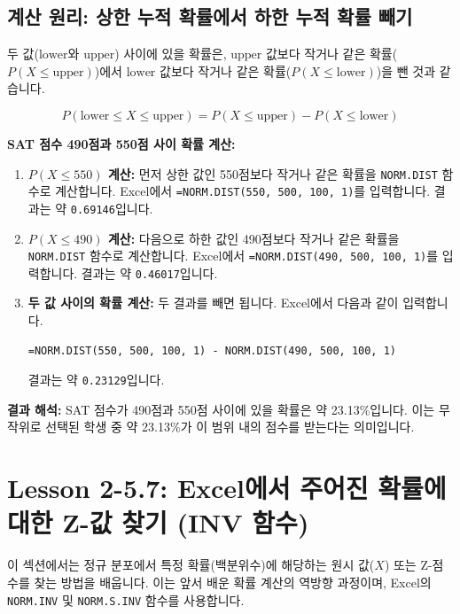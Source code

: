 \documentclass[11pt,a4paper]{article}
\theoremstyle{definition}
\newcommand{\newsection}[1]{\newpage\section{#1}}
\begin{document}
\subsection{계산 원리: 상한 누적 확률에서 하한 누적 확률 빼기}
두 값($\text{lower}$와 $\text{upper}$) 사이에 있을 확률은, $\text{upper}$ 값보다 작거나 같은 확률($P(X \le \text{upper})$)에서 $\text{lower}$ 값보다 작거나 같은 확률($P(X \le \text{lower})$)을 뺀 것과 같습니다.

\begin{equation*}
    P(\text{lower} \le X \le \text{upper}) = P(X \le \text{upper}) - P(X \le \text{lower})
\end{equation*}

\begin{examplebox}
    \textbf{SAT 점수 490점과 550점 사이 확률 계산:}
    \begin{enumerate}
        \item \textbf{$P(X \le 550)$ 계산:}
        먼저 상한 값인 550점보다 작거나 같은 확률을 \texttt{NORM.DIST} 함수로 계산합니다.
        Excel에서 \texttt{=NORM.DIST(550, 500, 100, 1)}를 입력합니다.
        결과는 약 \texttt{0.69146}입니다.

        \item \textbf{$P(X \le 490)$ 계산:}
        다음으로 하한 값인 490점보다 작거나 같은 확률을 \texttt{NORM.DIST} 함수로 계산합니다.
        Excel에서 \texttt{=NORM.DIST(490, 500, 100, 1)}를 입력합니다.
        결과는 약 \texttt{0.46017}입니다.

        \item \textbf{두 값 사이의 확률 계산:}
        두 결과를 빼면 됩니다. Excel에서 다음과 같이 입력합니다.
        \begin{lstlisting}[language=Excel, caption={Excel에서 '두 값 사이' 확률 계산 예시}, label={lst:norm_dist_between_values}]
=NORM.DIST(550, 500, 100, 1) - NORM.DIST(490, 500, 100, 1)
        \end{lstlisting}
        결과는 약 \texttt{0.23129}입니다.
    \end{enumerate}

    \textbf{결과 해석:}
    SAT 점수가 490점과 550점 사이에 있을 확률은 약 23.13\%입니다.
    이는 무작위로 선택된 학생 중 약 23.13\%가 이 범위 내의 점수를 받는다는 의미입니다.
\end{examplebox}

\newsection{Lesson 2-5.7: Excel에서 주어진 확률에 대한 Z-값 찾기 (INV 함수)}

이 섹션에서는 정규 분포에서 특정 확률(백분위수)에 해당하는 원시 값($X$) 또는 Z-점수를 찾는 방법을 배웁니다.
이는 앞서 배운 확률 계산의 역방향 과정이며, Excel의 \texttt{NORM.INV} 및 \texttt{NORM.S.INV} 함수를 사용합니다.
\end{document}
